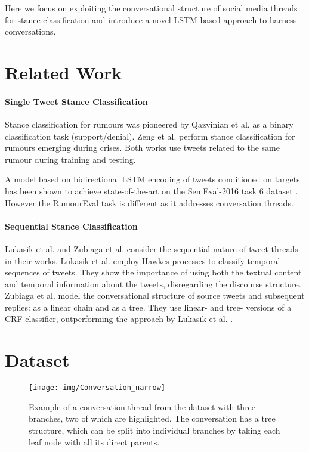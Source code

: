 \documentclass[11pt,a4paper]{article}
\begin{document}
Here we  focus on exploiting the conversational structure of social media threads for stance classification and introduce a novel LSTM-based approach to harness conversations.
\section{Related Work}
\paragraph{Single Tweet Stance Classification}

Stance classification for rumours was pioneered by Qazvinian et al.  as a binary classification task (support/denial).
Zeng et al.  perform stance classification for rumours emerging during crises. Both works use tweets related to the same rumour during training and testing. 

A model based on bidirectional LSTM encoding of tweets conditioned on targets has been shown to achieve state-of-the-art on the SemEval-2016 task 6 dataset \cite{augenstein2016stance}. However the RumourEval task is different as it addresses conversation threads.
\label{sect:data}
\paragraph{Sequential Stance Classification}
 Lukasik et al.  and Zubiaga et al.  consider the sequential nature of tweet threads in their works. Lukasik et al.  employ Hawkes processes to classify temporal sequences of tweets. They show the importance of using both the textual content and temporal information about the tweets, disregarding the discourse structure. Zubiaga et al.  model the conversational structure of source tweets and subsequent replies: as a linear chain and as a tree. They use linear- and tree- versions of a CRF classifier, outperforming the approach by Lukasik et al. . 

\section{Dataset}
\begin{figure}[t]
	\centering
	\texttt{[image: img/Conversation\_narrow]}
	\vspace{-1.5cm}
	\caption{Example of a conversation thread from the dataset with three branches, two of which are highlighted. The conversation has a tree structure, which can be split into individual branches by taking each leaf node with all its direct parents.}\vspace{-0.3cm}
	\label{fig:Conversation}
\end{figure}
\end{document}
